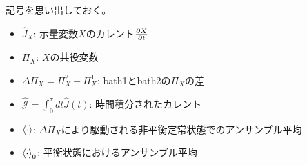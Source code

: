 \documentclass[a4paper,11pt]{jsarticle}
\begin{document}

記号を思い出しておく。
\begin{itemize}
    \item $\hat{J}_{X}$: 示量変数$X$のカレント$\pdv{X}{t}$
    \item $\Pi_X$: $X$の共役変数
    \item $\Delta \Pi_X = \Pi_X ^2 - \Pi_X ^1$: bath1とbath2の$\Pi_X$の差
    \item $\hat{\mathcal{J}} = \int_0 ^{\tau} dt \hat{J}(t)$: 時間積分されたカレント
    \item $\ev{\cdot}$: $\Delta \Pi_X$により駆動される非平衡定常状態でのアンサンブル平均
    \item $\ev{\cdot}_0$: 平衡状態におけるアンサンブル平均
\end{itemize}
\end{document}
